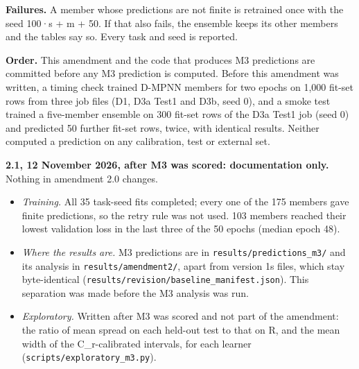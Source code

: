 \textbf{Failures.} A member whose predictions are not finite is
retrained once with the seed 100·s + m + 50. If that also fails, the
ensemble keeps its other members and the tables say so. Every task and
seed is reported.

\textbf{Order.} This amendment and the code that produces M3 predictions
are committed before any M3 prediction is computed. Before this
amendment was written, a timing check trained D-MPNN members for two
epochs on 1,000 fit-set rows from three job files (D1, D3a Test1 and
D3b, seed 0), and a smoke test trained a five-member ensemble on 300
fit-set rows of the D3a Test1 job (seed 0) and predicted 50 further
fit-set rows, twice, with identical results. Neither computed a
prediction on any calibration, test or external set.

\textbf{2.1, 12 November 2026, after M3 was scored: documentation only.}
Nothing in amendment 2.0 changes.

\begin{itemize}
\tightlist
\item
  \emph{Training.} All 35 task-seed fits completed; every one of the 175
  members gave finite predictions, so the retry rule was not used. 103
  members reached their lowest validation loss in the last three of the
  50 epochs (median epoch 48).
\item
  \emph{Where the results are.} M3 predictions are in
  \texttt{results/predictions\_m3/} and its analysis in
  \texttt{results/amendment2/}, apart from version 1\textquotesingle s
  files, which stay byte-identical
  (\texttt{results/revision/baseline\_manifest.json}). This separation
  was made before the M3 analysis was run.
\item
  \emph{Exploratory.} Written after M3 was scored and not part of the
  amendment: the ratio of mean spread on each held-out test to that on
  R, and the mean width of the C\_r-calibrated intervals, for each
  learner (\texttt{scripts/exploratory\_m3.py}).
\end{itemize}
